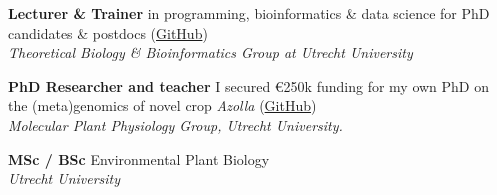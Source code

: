 \documentclass[a4paper,10pt]{article}
\begin{document}
{\begin{adjustbox}{valign=t}
\begin{minipage}[t]{0.3\textwidth}
\begin{spacing}{1}
\begin{itemize}

\end{itemize}
\end{spacing}


\end{minipage}%
\end{adjustbox}%
\hfill%


\begin{adjustbox}{valign=t}
\hfill%
\begin{minipage}[t]{0.05\textwidth}
\MyVerticalRule
\end{minipage}%
\end{adjustbox}

\begin{adjustbox}{valign=t}
\hfill%
\begin{minipage}[t]{0.6\textwidth}


\begin{description}
\raggedright
  \item[\normalfont \textcolor{ForestGreen}{\textbf{2022 -- now.}}] \textbf{Lecturer \&  Trainer} 
    in programming, bioinformatics \& data science for PhD candidates \& postdocs 
    (\href{https://github.com/lauralwd/professional_education}{GitHub})\\
    \textit{Theoretical Biology \& Bioinformatics Group at Utrecht University}
  \item[\normalfont \textcolor{ForestGreen}{\textbf{2017 -- 2022.}}] \textbf{PhD Researcher and teacher} 
    I secured €250k funding for my own PhD on the (meta)genomics of novel crop \textit{Azolla} 
    (\href{https://github.com/lauralwd/azolla_phd_thesis}{GitHub})\\ 
    \textit{Molecular Plant Physiology Group, Utrecht University.}
  \item[\normalfont \textcolor{ForestGreen}{\textbf{2010 -- 2017.}}] \textbf{MSc / BSc} Environmental Plant Biology \\
    \textit{Utrecht University}
\end{description}


\end{minipage}
\end{adjustbox}}
\end{document}
